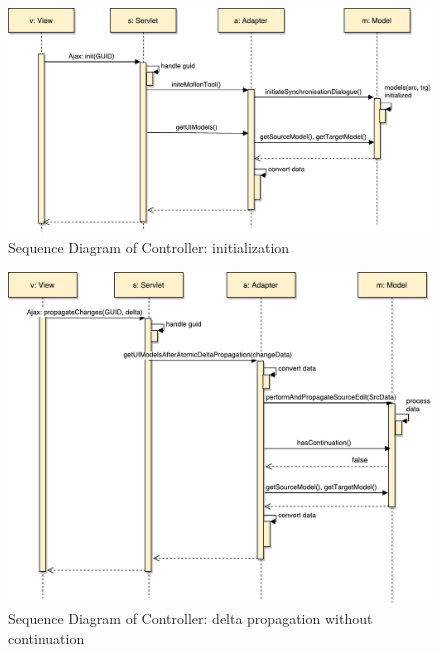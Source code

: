 \begin{figure}
	\centering
	\includegraphics[width=1\textwidth]{figures/Sequence_Diagram-Controller(init)}
	\caption{Sequence Diagram of Controller: initialization}
	\label{fig:Sequence_Diagram-Controller(init)}
\end{figure}

\begin{figure}
	\centering
	\includegraphics[width=1\textwidth]{figures/Sequence_Diagram-Controller(cont-false)}
	\caption{Sequence Diagram of Controller: delta propagation without continuation}
	\label{fig:Sequence_Diagram-Controller(cont-false)}
\end{figure}

